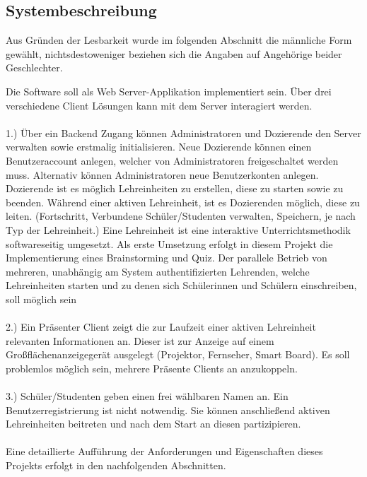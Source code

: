\subsection{Systembeschreibung}\label{sec:sysbeschreib}
Aus Gründen der Lesbarkeit wurde im folgenden Abschnitt die männliche Form gewählt, nichtsdestoweniger beziehen sich die Angaben auf Angehörige beider Geschlechter. 

Die Software soll als Web Server-Applikation implementiert sein. Über drei verschiedene Client Lösungen kann mit dem Server interagiert werden. \\ \\

1.) Über ein Backend Zugang können Administratoren und Dozierende den Server verwalten sowie erstmalig initialisieren. Neue Dozierende können einen Benutzeraccount anlegen, welcher von Administratoren freigeschaltet werden muss. Alternativ können Administratoren neue Benutzerkonten anlegen. Dozierende ist es möglich Lehreinheiten zu erstellen, diese zu starten sowie zu beenden. Während einer aktiven Lehreinheit, ist es Dozierenden möglich, diese zu leiten. (Fortschritt, Verbundene Schüler/Studenten verwalten, Speichern, je nach Typ der Lehreinheit.) Eine Lehreinheit ist eine interaktive Unterrichtsmethodik softwareseitig umgesetzt. Als erste Umsetzung erfolgt in diesem Projekt die Implementierung eines Brainstorming und Quiz. Der parallele Betrieb von mehreren, unabhängig am System authentifizierten Lehrenden, welche Lehreinheiten starten und zu denen sich Schülerinnen und Schülern einschreiben, soll möglich sein \\ \\

2.) Ein Präsenter Client zeigt die zur Laufzeit einer aktiven Lehreinheit relevanten Informationen an. Dieser ist zur Anzeige auf einem Großflächenanzeigegerät ausgelegt (Projektor, Fernseher, Smart Board). Es soll problemlos möglich sein, mehrere Präsente Clients an anzukoppeln. \\ \\
3.) Schüler/Studenten geben einen frei wählbaren Namen an. Ein Benutzerregistrierung ist nicht notwendig. Sie können anschließend aktiven Lehreinheiten beitreten und nach dem Start an diesen partizipieren. \\ \\

Eine detaillierte Aufführung der Anforderungen und Eigenschaften dieses Projekts erfolgt in den nachfolgenden Abschnitten. 

